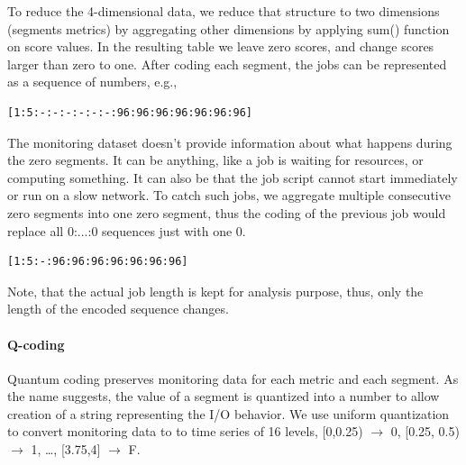 \documentclass{jhps}
\begin{document}
To reduce the 4-dimensional data, we reduce that structure to two dimensions (segments metrics) by aggregating other dimensions by applying sum() function on score values.
In the resulting table we leave zero scores, and change scores larger than zero to one.
After coding each segment, the jobs can be represented as a sequence of numbers, e.g.,

\begin{lstlisting}[caption={B-coding of a 15 segments long job.}]
[1:5:-:-:-:-:-:-:96:96:96:96:96:96:96]
\end{lstlisting}

The monitoring dataset doesn't provide information about what happens during the zero segments.
It can be anything, like a job is waiting for resources, or computing something.
It can also be that the job script cannot start immediately or run on a slow network.
To catch such jobs, we aggregate multiple consecutive zero segments into one zero segment, thus the coding of the previous job would replace all 0:...:0 sequences just with one 0.

\begin{lstlisting}[caption={B-coding of a 15 segments long job with zero aggregation applied.}]
[1:5:-:96:96:96:96:96:96:96]
\end{lstlisting}

Note, that the actual job length is kept for analysis purpose, thus, only the length of the encoded sequence changes.

\paragraph*{Q-coding}
Quantum coding preserves monitoring data for each metric and each segment.
As the name suggests, the value of a segment is quantized into a number to allow creation of a string representing the I/O behavior.
We use uniform quantization to convert monitoring data to to time series of 16 levels, [0,0.25) $\rightarrow$ 0, [0.25, 0.5) $\rightarrow$ 1, \dots, [3.75,4] $\rightarrow$ F.

\end{document}
